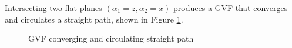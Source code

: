 \documentclass[conf]{new-aiaa}
\begin{document}
Intersecting two flat planes $(\alpha_1 = z,\alpha_2 = x)$ produces a GVF that converges and circulates a straight path, shown in Figure \ref{fig:GVFLine}. 

\begin{figure}[H]
	\begin{subfigmatrix}{2}%
		\centering	
		\hspace*{0mm}
	\end{subfigmatrix}
	\caption{GVF converging and circulating straight path}
	\label{fig:GVFLine}
\end{figure} 
\end{document}
